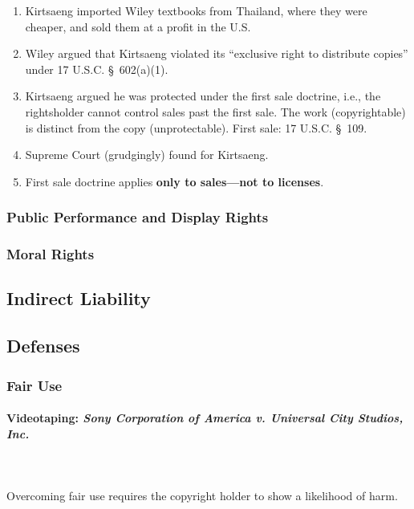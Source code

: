\begin{enumerate}
    \item Kirtsaeng imported Wiley textbooks from Thailand, where they were 
    cheaper, and sold them at a profit in the U.S.
    \item Wiley argued that Kirtsaeng violated its ``exclusive right to 
    distribute copies'' under 17 U.S.C. \S\ 602(a)(1).
    \item Kirtsaeng argued he was protected under the first sale doctrine, 
    i.e., the rightsholder cannot control sales past the first sale. The work 
    (copyrightable) is distinct from the copy (unprotectable). First sale: 17 
    U.S.C. \S\ 109.
    \item Supreme Court (grudgingly) found for Kirtsaeng.
    \item First sale doctrine applies \textbf{only to sales---not to 
    licenses}.
\end{enumerate}

\subsubsection{Public Performance and Display Rights}


\subsubsection{Moral Rights}


\subsection{Indirect Liability}


\subsection{Defenses}


\subsubsection{Fair Use}

\paragraph{Videotaping: \emph{Sony Corporation of America v. Universal City 
Studios, Inc.}}
~\\\\
Overcoming fair use requires the copyright holder to show a likelihood of 
harm.

